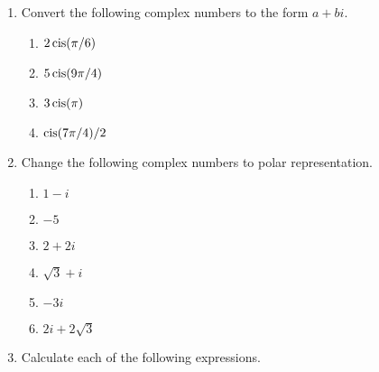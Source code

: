 {\begin{enumerate}
\begin{multicols}{2}
\begin{enumerate}
\item
$(9-i) \overline{(9-i)}$
 
 \item
$i^{45}$

\item
$(1+i)+\overline{(1+i)}$
 
\end{enumerate}
\end{multicols}
 
 
 \item   %
Convert the following complex numbers to the form $a + bi$.
\begin{multicols}{2}
\begin{enumerate}

 \item
$2 \operatorname{cis}(\pi / 6 )$

 
 \item
$5 \operatorname{cis}(9\pi/4)$

\item
$3 \operatorname{cis}(\pi)$
 
 \item
$\operatorname{cis}(7\pi/4) /2$
 
\end{enumerate}
\end{multicols}


\item	  %
Change the following complex numbers to polar representation.
\begin{multicols}{3}
\begin{enumerate}
 
 \item
$1-i$

 \item
$-5$
 
 \item
$2+2i$
 
 
\item
$\sqrt{3} + i$

 \item
$-3i$

 \item
$2i + 2 \sqrt{3}$
 
\end{enumerate}
\end{multicols}

 
 
\item %
Calculate each of the following expressions.
\begin{multicols}{2}
\begin{enumerate}
 

\end{enumerate}
\end{multicols}
\end{enumerate}}
